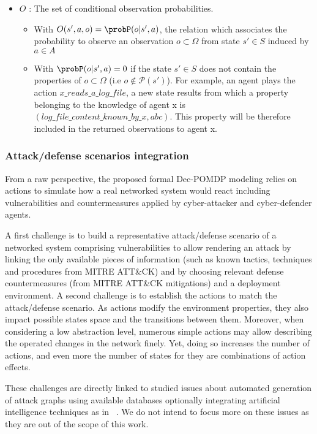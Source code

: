 \begin{itemize}
    \item $O$ : The set of conditional observation probabilities.
    \begin{itemize}
        \item With $O(s',a,o) = \probP(o|s',a)$, the relation which associates the probability to observe an observation $o \subset \Omega$ from state $s' \in S$ induced by $a \in A$
        \item With $\probP(o|s',a) = 0$ if the state $s' \in S$ does not contain the properties of $o \subset \Omega$ (i.e $o \not\in \mathcal{P}(s')$). For example, an agent plays the action $x\_reads\_a\_log\_file$, a new state results from which a property belonging to the knowledge of agent x is $(log\_file\_content\_known\_by\_x, \allowbreak abc)$. This property will be therefore included in the returned observations to agent x. 
    \end{itemize}

\end{itemize}


\subsubsection{Attack/defense scenarios integration\label{sec:ad_integration}}

\noindent
From a raw perspective, the proposed formal Dec-POMDP modeling relies on actions to simulate how a real networked system would react including vulnerabilities and countermeasures applied by cyber-attacker and cyber-defender agents.

A first challenge is to build a representative attack/defense scenario of a networked system comprising vulnerabilities to allow rendering an attack by linking the only available pieces of information (such as known tactics, techniques and procedures from MITRE ATT\&CK) and by choosing relevant defense countermeasures (from MITRE ATT\&CK mitigations) and a deployment environment. A second challenge is to establish the actions to match the attack/defense scenario. As actions modify the environment properties, they also impact possible states space and the transitions between them.
Moreover, when considering a low abstraction level, numerous simple actions may allow describing the operated changes in the network finely. Yet, doing so increases the number of actions, and even more the number of states for they are combinations of action effects.

These challenges are directly linked to studied issues about automated generation of attack graphs using available databases optionally integrating artificial intelligence techniques as in ~\cite{GFalco2018}. We do not intend to focus more on these issues as they are out of the scope of this work.

